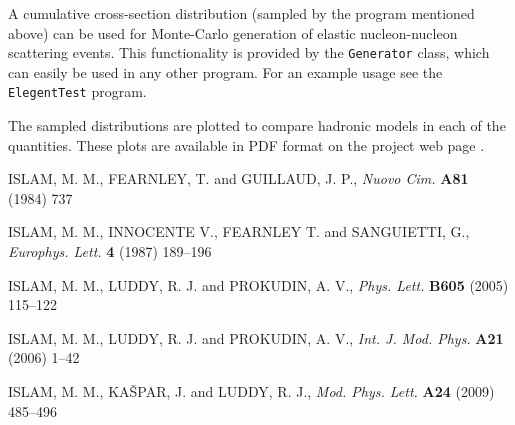 \documentclass[preprint,12pt]{elsarticle}
\begin{document}
A cumulative cross-section distribution (sampled by the program mentioned above) can be used for Monte-Carlo generation of elastic nucleon-nucleon scattering events. This functionality is provided by the {\tt Generator} class, which can easily be used in any other program. For an example usage see the  {\tt ElegentTest} program.

The sampled distributions are plotted to compare hadronic models in each of the quantities. These plots are available in PDF format on the project web page \cite[Plots section]{elegent}.





\begin{thebibliography}{00}


\def\Name#1{#1, }
\def\REVIEW#1#2#3#4{{\it #1} {\bf #2} (#3) #4}

	\Name{ISLAM, M. M., FEARNLEY, T. and GUILLAUD, J. P.}
	\REVIEW{Nuovo Cim.}{A81}{1984}{737}

	\Name{ISLAM, M. M., INNOCENTE V., FEARNLEY T. and SANGUIETTI, G.}
	\REVIEW{Europhys. Lett.}{4}{1987}{189--196}


	\Name{ISLAM, M. M., LUDDY, R. J. and PROKUDIN, A. V.}
	\REVIEW{Phys. Lett.}{B605}{2005}{115--122}
    
	\Name{ISLAM, M. M., LUDDY, R. J. and PROKUDIN, A. V.}
	\REVIEW{Int. J. Mod. Phys.}{A21}{2006}{1--42}


	\Name{ISLAM, M. M., KA\v SPAR, J. and LUDDY, R. J.}
	\REVIEW{Mod. Phys. Lett.}{A24}{2009}{485--496}



\end{thebibliography}
\end{document}
